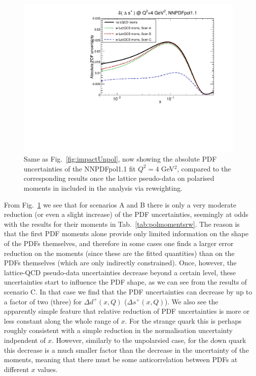 \begin{figure}[!t]
\includegraphics[scale=0.45]{plots/xsp-pol-lattice-relerr.pdf}
\caption{\small Same as Fig.~\ref{fig:impactUnpol}, now
  showing the absolute PDF uncertainties of the NNPDFpol1.1 fit
   $Q^2=4$ GeV$^2$,
  compared to the corresponding results once the lattice pseudo-data
  on polarised moments in included in the analysis via
  reweighting.
}    
\label{fig:impactPol}
\end{figure}

From Fig.~\ref{fig:impactPol} we see that for scenarios
A and B there is only a very moderate reduction (or even a slight increase)
of the PDF uncertainties, seemingly at odds with the results
for their moments in Tab.~\ref{tab:polmomentsrw}.
%
The reason is that the first PDF moments alone provide only limited
information on the shape of the PDFs themselves, and therefore in some
cases one finds a larger error reduction on the moments (since these
are the fitted quantities) than on the PDFs themselves (which are
only indirectly constrained).
%
Once, however, the lattice-QCD pseudo-data uncertainties
decrease beyond a certain level, these uncertainties start to influence the PDF shape, 
as we can see from the results of scenario C.
%
In that case we find that the PDF uncertainties can decrease by up to a factor
of two (three) for $\Delta d^+(x,Q)$ ($\Delta s^+(x,Q)$).
We also see the apparently simple feature that relative reduction of PDF uncertainties is more
or less constant along the whole range of $x$. 
For the strange quark this is perhaps 
roughly consistent with a simple reduction in the normalisation 
uncertainty indpendent of $x$.
However, similarly to the unpolarsied case, for the down quark this 
decrease is a much smaller 
factor than the decrease in the uncertainty of the moments, meaning that
there must be some anticorrelation between PDFs at different $x$ values.  

